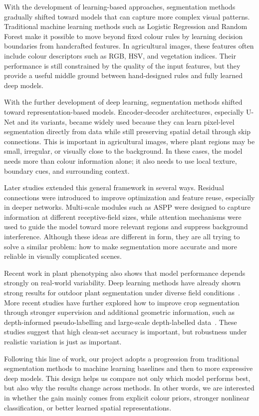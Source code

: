 \documentclass[conference]{IEEEtran}
\begin{document}
With the development of learning-based approaches, segmentation methods
gradually shifted toward models that can capture more complex visual
patterns. Traditional machine learning methods such as Logistic
Regression and Random Forest make it possible to move beyond fixed
colour rules by learning decision boundaries from handcrafted features.
In agricultural images, these features often include colour descriptors
such as RGB, HSV, and vegetation indices. Their performance is still
constrained by the quality of the input features, but they provide a
useful middle ground between hand-designed rules and fully learned deep
models.

With the further development of deep learning, segmentation methods
shifted toward representation-based models. Encoder-decoder
architectures, especially U-Net and its variants, became widely used
because they can learn pixel-level segmentation directly from data while
still preserving spatial detail through skip connections. This is
important in agricultural images, where plant regions may be small,
irregular, or visually close to the background. In these cases, the
model needs more than colour information alone; it also needs to use
local texture, boundary cues, and surrounding context.

Later studies extended this general framework in several ways. Residual
connections were introduced to improve optimization and feature reuse,
especially in deeper networks. Multi-scale modules such as ASPP were
designed to capture information at different receptive-field sizes,
while attention mechanisms were used to guide the model toward more
relevant regions and suppress background interference. Although these
ideas are different in form, they are all trying to solve a similar
problem: how to make segmentation more accurate and more reliable in
visually complicated scenes.

Recent work in plant phenotyping also shows that model performance
depends strongly on real-world variability. Deep learning methods have
already shown strong results for outdoor plant segmentation under
diverse field conditions~\cite{zenkl2022}. More recent studies have
further explored how to improve crop segmentation through stronger
supervision and additional geometric information, such as depth-informed
pseudo-labelling and large-scale depth-labelled data~\cite{cao2025,zhang2026}.
These studies suggest that high clean-set accuracy is important, but
robustness under realistic variation is just as important.

Following this line of work, our project adopts a progression from
traditional segmentation methods to machine learning baselines and then
to more expressive deep models. This design helps us compare not only
which model performs best, but also why the results change across
methods. In other words, we are interested in whether the gain mainly
comes from explicit colour priors, stronger nonlinear classification, or
better learned spatial representations.
\end{document}
